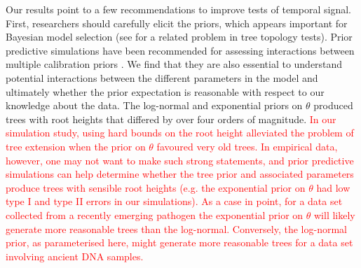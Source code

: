 \documentclass[10pt,letterpaper]{article}
\begin{document}
Our results point to a few recommendations to improve tests of temporal signal. First, researchers should carefully elicit the priors, which appears important for Bayesian model selection (see \cite{bergsten2013bayesian} for a related problem in tree topology tests). Prior predictive simulations have been recommended for assessing interactions between multiple calibration priors \cite{warnock2015calibration}. We find that they are also essential to understand potential interactions between the different parameters in the model and ultimately whether the prior expectation is reasonable with respect to our knowledge about the data. The log-normal and exponential priors on $\theta$ produced trees with root heights that differed by over four orders of magnitude. \textcolor{red}{In our simulation study, using hard bounds on the root height alleviated the problem of tree extension when the prior on $\theta$ favoured very old trees. In empirical data, however, one may not want to make such strong statements, and prior predictive simulations can help determine whether the tree prior and associated parameters produce trees with sensible root heights (e.g. the exponential prior on $\theta$ had low type I and type II errors in our simulations). As a case in point, for a data set collected from a recently emerging pathogen the exponential prior on $\theta$ will likely generate more reasonable trees than the log-normal. Conversely, the log-normal prior, as parameterised here, might generate more reasonable trees for a data set involving ancient DNA samples.}
\end{document}

